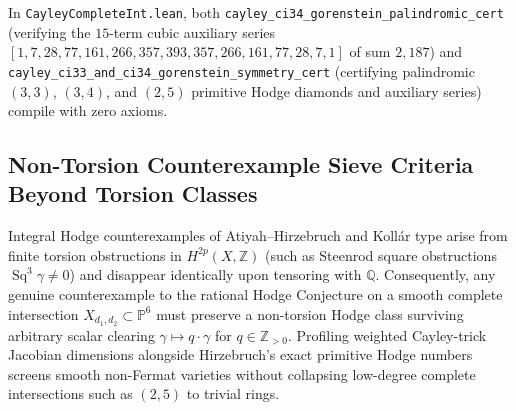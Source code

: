 \documentclass[11pt,a4paper]{article}
\begin{document}
\begin{table}[htbp]
  \centering
  \caption{Primitive Hodge diamonds, weighted Cayley-trick Jacobian dimensions ($0 \le w \le 4$), and $7$-variable split Gorenstein auxiliary series for smooth complete-intersection fourfolds in $\mathbb{P}^6$.}
  \label{tab:cayley_ci}
\end{table}

In \texttt{CayleyCompleteInt.lean}, both \texttt{cayley\_ci34\_gorenstein\_palindromic\_cert} (verifying the $15$-term cubic auxiliary series $[1, 7, 28, 77, 161, 266, 357, 393, 357, 266, 161, 77, 28, 7, 1]$ of sum $2{,}187$) and \texttt{cayley\_ci33\_and\_ci34\_gorenstein\_symmetry\_cert} (certifying palindromic $(3,3)$, $(3,4)$, and $(2,5)$ primitive Hodge diamonds and auxiliary series) compile with zero axioms.

\subsection{Non-Torsion Counterexample Sieve Criteria Beyond Torsion Classes}

Integral Hodge counterexamples of Atiyah--Hirzebruch and Koll\'ar type arise from finite torsion obstructions in $H^{2p}(X, \mathbb{Z})$ (such as Steenrod square obstructions $\operatorname{Sq}^3 \gamma \ne 0$) and disappear identically upon tensoring with $\mathbb{Q}$. Consequently, any genuine counterexample to the rational Hodge Conjecture on a smooth complete intersection $X_{d_1,d_2} \subset \mathbb{P}^6$ must preserve a non-torsion Hodge class surviving arbitrary scalar clearing $\gamma \mapsto q \cdot \gamma$ for $q \in \mathbb{Z}_{>0}$. Profiling weighted Cayley-trick Jacobian dimensions alongside Hirzebruch's exact primitive Hodge numbers screens smooth non-Fermat varieties without collapsing low-degree complete intersections such as $(2, 5)$ to trivial rings.
\end{document}
